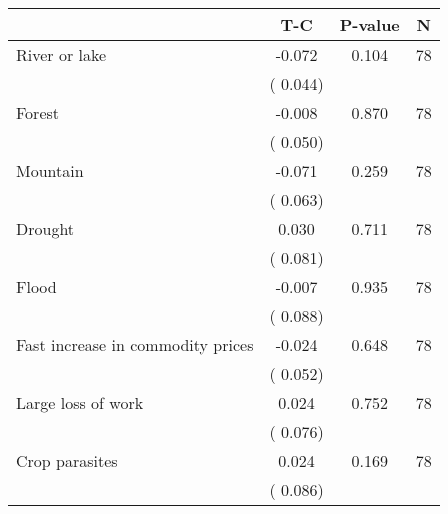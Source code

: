 
\begin{tabular}{l*{3}{c}}\hline&\multicolumn{1}{c}{T-C}&\multicolumn{1}{c}{P-value}&\multicolumn{1}{c}{N} \\ \hline
 River or lake                 &             -0.072          &        0.104 & 78          \\ 
                               &        (       0.044)             &                        &                              \\ 
 Forest                 &             -0.008          &        0.870 & 78          \\ 
                               &        (       0.050)             &                        &                              \\ 
 Mountain                 &             -0.071          &        0.259 & 78          \\ 
                               &        (       0.063)             &                        &                              \\ 
 Drought                 &              0.030          &        0.711 & 78          \\ 
                               &        (       0.081)             &                        &                              \\ 
 Flood                 &             -0.007          &        0.935 & 78          \\ 
                               &        (       0.088)             &                        &                              \\ 
 Fast increase in commodity prices                 &             -0.024          &        0.648 & 78          \\ 
                               &        (       0.052)             &                        &                              \\ 
 Large loss of work                 &              0.024          &        0.752 & 78          \\ 
                               &        (       0.076)             &                        &                              \\ 
 Crop parasites                 &              0.024          &        0.169 & 78          \\ 
                               &        (       0.086)             &                        &                              \\ 

\end{tabular}
